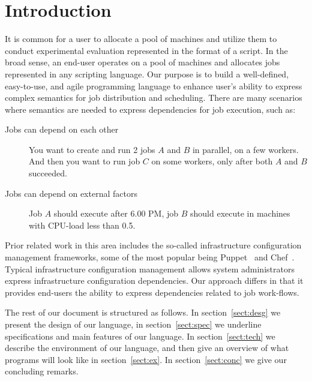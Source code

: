 \section{Introduction}
\label{sect:intro}

It is common for a user to allocate a pool of machines and utilize them to
conduct experimental evaluation represented in the format of a script. In the
broad sense, an end-user operates on a pool of machines and allocates jobs
represented in any scripting language. Our purpose is to build a well-defined,
easy-to-use, and agile programming language to enhance user's ability to express
complex semantics for job distribution and scheduling. There are many scenarios
where semantics are needed to express dependencies for job execution, such as:
\begin{description}
\item[Jobs can depend on each other] You want to create and run 2 jobs $A$ and
$B$ in parallel, on a few workers. And then you want to run job $C$ on some
workers, only after both $A$ and $B$ succeeded.
\item[Jobs can depend on external factors] Job $A$ should execute after 6.00 PM,
job $B$ should execute in machines with CPU-load less than 0.5.
\end{description}

Prior related work in this area includes the so-called infrastructure
configuration management frameworks, some of the most popular being
Puppet~\cite{puppet} and Chef~\cite{chef}. Typical infrastructure
configuration management allows system administrators express
infrastructure configuration dependencies. Our approach differs in that
it provides end-users the ability to express dependencies related to
job work-flows.

The rest of our document is structured as follows. In section~\ref{sect:desg} we
present the design of our language, in section~\ref{sect:spec} we underline
specifications and main features of our language. In section~\ref{sect:tech} we
describe the environment of our language, and then give an overview of what
programs will look like in section~\ref{sect:ex}. In section~\ref{sect:conc} we
give our concluding remarks.
